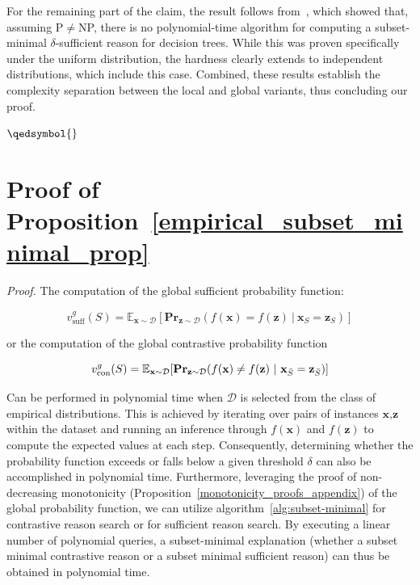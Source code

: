 \documentclass{article}
\newcommand{\z}{\textbf{z}}
\newcommand{\x}{\textbf{x}}
\begin{document}
For the remaining part of the claim, the result follows from~\citep{arenas2022computing}, which showed that, assuming P$\neq$NP, there is no polynomial-time algorithm for computing a subset-minimal $\delta$-sufficient reason for decision trees. While this was proven specifically under the uniform distribution, the hardness clearly extends to independent distributions, which include this case. Combined, these results establish the complexity separation between the local and global variants, thus concluding our proof.


$\qedsymbol{}$



\section{Proof of Proposition~\ref{empirical_subset_minimal_prop}}
\label{empirical_subset_minimal_prop_sec}


\empiricalsubsetminimal*


\emph{Proof.} The computation of the global sufficient probability function:

\begin{equation}
v^g_{\text{suff}}(S)=\mathbb{E}_{\x\sim\mathcal{D}}[
\textbf{Pr}_{\z\sim\mathcal{D}}(f(\x)=f(\z) \ | \ \x_S=\z_S)]
\end{equation}

or the computation of the global contrastive probability function


\begin{equation}
v^g_{\text{con}}(S)=\mathbb{E}_{\x\sim\mathcal{D}}[
\textbf{Pr}_{\z\sim\mathcal{D}}(f(\x)\neq f(\z) \ | \ \x_{\Bar{S}}=\z_{\Bar{S}})]
\end{equation}


Can be performed in polynomial time when $\mathcal{D}$ is selected from the class of empirical distributions. This is achieved by iterating over pairs of instances $\x,\z$ within the dataset and running an inference through $f(\x)$ and $f(\z)$ to compute the expected values at each step. Consequently, determining whether the probability function exceeds or falls below a given threshold $\delta$ can also be accomplished in polynomial time. Furthermore, leveraging the proof of non-decreasing monotonicity (Proposition~\ref{monotonicity_proofs_appendix}) of the global probability function, we can utilize algorithm~\ref{alg:subset-minimal} for contrastive reason search or for sufficient reason search. By executing a linear number of polynomial queries, a subset-minimal explanation (whether a subset minimal contrastive reason or a subset minimal sufficient reason) can thus be obtained in polynomial time.
\end{document}
